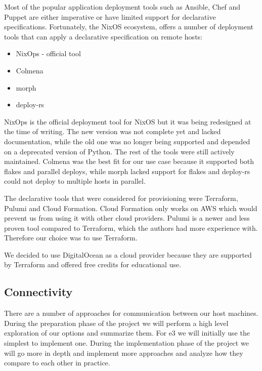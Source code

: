 \documentclass[
]{article}
\providecommand{\tightlist}{%
  \setlength{\itemsep}{0pt}\setlength{\parskip}{0pt}}
\begin{document}
Most of the popular application deployment tools such as Ansible, Chef
and Puppet are either imperative or have limited support for declarative
specifications. Fortunately, the NixOS ecosystem, offers a number of
deployment tools that can apply a declarative specification on remote
hosts:

\begin{itemize}
  \tightlist
  \item
        NixOps\autocite{nixopsSource,nixopsDocs} - official tool
  \item
        Colmena \autocite{colmenaSource,colmenaDocs}
  \item
        morph \autocite{morphSource}
  \item
        deploy-rs \autocite{deployrsSource}
\end{itemize}

NixOps is the official deployment tool for NixOS but it was being
redesigned at the time of writing. The new version was not complete yet
and lacked documentation, while the old one was no longer being
supported and depended on a deprecated version of Python. The rest of
the tools were still actively maintained. Colmena was the best fit for
our use case because it supported both flakes and parallel deploys,
while morph lacked support for flakes and deploy-rs could not deploy to
multiple hosts in parallel.

The declarative tools that were considered for provisioning were
Terraform, Pulumi and Cloud Formation. Cloud Formation only works on AWS
which would prevent us from using it with other cloud providers. Pulumi
is a newer and less proven tool compared to Terraform, which the authors
had more experience with. Therefore our choice was to use Terraform.

We decided to use DigitalOcean as a cloud provider because they are
supported by Terraform and offered free credits for educational use.

\hypertarget{connectivity}{%
  \subsection{Connectivity}\label{connectivity}}

There are a number of approaches for communication between our host
machines. During the preparation phase of the project we will perform a
high level exploration of our options and summarize them. For \gls{e3}
we will initially use the simplest to implement one. During the
implementation phase of the project we will go more in depth and
implement more approaches and analyze how they compare to each other in
practice.
\end{document}
